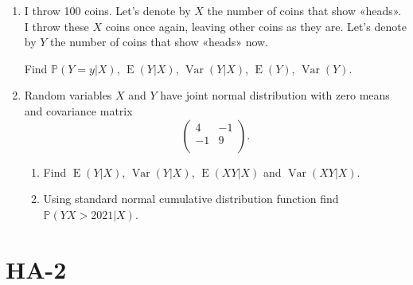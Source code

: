 \documentclass[12pt]{article}
\DeclareMathOperator{\Var}{Var}
\DeclareMathOperator{\E}{E}
\def \P{\mathbb{P}}
\begin{document}
\begin{enumerate}
\item I throw 100 coins. Let's denote by $X$ the number of coins that show «heads».
I throw these $X$ coins once again, leaving other coins as they are. 
Let's denote by $Y$ the number of coins that show «heads» now.

Find $\P(Y=y|X)$, $\E(Y|X)$, $\Var(Y|X)$, $\E(Y)$, $\Var(Y)$.




\item Random variables $X$ and $Y$ have joint normal distribution with zero means and covariance matrix
\[
\begin{pmatrix}
4 & -1 \\
-1 & 9 \\
\end{pmatrix}.
\]

\begin{enumerate}
  \item Find $\E(Y|X)$, $\Var(Y|X)$, $\E(XY|X)$ and $\Var(XY|X)$.
  \item Using standard normal cumulative distribution function find $\P(YX > 2021 | X)$.
\end{enumerate}



\end{enumerate}

\newpage
\section{HA-2}
\end{document}
